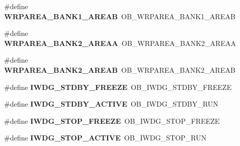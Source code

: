 \begin{DoxyCompactItemize}
\item 
\hypertarget{group___h_a_l___f_l_a_s_h___aliased___defines_ga073be154a6602831a813316fa4fb17ca}{\#define {\bfseries W\-R\-P\-A\-R\-E\-A\-\_\-\-B\-A\-N\-K1\-\_\-\-A\-R\-E\-A\-B}~O\-B\-\_\-\-W\-R\-P\-A\-R\-E\-A\-\_\-\-B\-A\-N\-K1\-\_\-\-A\-R\-E\-A\-B}\label{group___h_a_l___f_l_a_s_h___aliased___defines_ga073be154a6602831a813316fa4fb17ca}

\item 
\hypertarget{group___h_a_l___f_l_a_s_h___aliased___defines_ga385f3bbec731cc31de0a8f83943f678c}{\#define {\bfseries W\-R\-P\-A\-R\-E\-A\-\_\-\-B\-A\-N\-K2\-\_\-\-A\-R\-E\-A\-A}~O\-B\-\_\-\-W\-R\-P\-A\-R\-E\-A\-\_\-\-B\-A\-N\-K2\-\_\-\-A\-R\-E\-A\-A}\label{group___h_a_l___f_l_a_s_h___aliased___defines_ga385f3bbec731cc31de0a8f83943f678c}

\item 
\hypertarget{group___h_a_l___f_l_a_s_h___aliased___defines_gad9e82d85eb324cdc5d4c5071a5b41dc6}{\#define {\bfseries W\-R\-P\-A\-R\-E\-A\-\_\-\-B\-A\-N\-K2\-\_\-\-A\-R\-E\-A\-B}~O\-B\-\_\-\-W\-R\-P\-A\-R\-E\-A\-\_\-\-B\-A\-N\-K2\-\_\-\-A\-R\-E\-A\-B}\label{group___h_a_l___f_l_a_s_h___aliased___defines_gad9e82d85eb324cdc5d4c5071a5b41dc6}

\item 
\hypertarget{group___h_a_l___f_l_a_s_h___aliased___defines_ga29ecb28c7e5de9b73778a4de74cdba4e}{\#define {\bfseries I\-W\-D\-G\-\_\-\-S\-T\-D\-B\-Y\-\_\-\-F\-R\-E\-E\-Z\-E}~O\-B\-\_\-\-I\-W\-D\-G\-\_\-\-S\-T\-D\-B\-Y\-\_\-\-F\-R\-E\-E\-Z\-E}\label{group___h_a_l___f_l_a_s_h___aliased___defines_ga29ecb28c7e5de9b73778a4de74cdba4e}

\item 
\hypertarget{group___h_a_l___f_l_a_s_h___aliased___defines_ga24bb71bfed2d31ab1c89e2c14617a738}{\#define {\bfseries I\-W\-D\-G\-\_\-\-S\-T\-D\-B\-Y\-\_\-\-A\-C\-T\-I\-V\-E}~O\-B\-\_\-\-I\-W\-D\-G\-\_\-\-S\-T\-D\-B\-Y\-\_\-\-R\-U\-N}\label{group___h_a_l___f_l_a_s_h___aliased___defines_ga24bb71bfed2d31ab1c89e2c14617a738}

\item 
\hypertarget{group___h_a_l___f_l_a_s_h___aliased___defines_gafa9a4aaff8763eed2aaeae674dffd159}{\#define {\bfseries I\-W\-D\-G\-\_\-\-S\-T\-O\-P\-\_\-\-F\-R\-E\-E\-Z\-E}~O\-B\-\_\-\-I\-W\-D\-G\-\_\-\-S\-T\-O\-P\-\_\-\-F\-R\-E\-E\-Z\-E}\label{group___h_a_l___f_l_a_s_h___aliased___defines_gafa9a4aaff8763eed2aaeae674dffd159}

\item 
\hypertarget{group___h_a_l___f_l_a_s_h___aliased___defines_gab00290e46777b5c22558554403dee8c4}{\#define {\bfseries I\-W\-D\-G\-\_\-\-S\-T\-O\-P\-\_\-\-A\-C\-T\-I\-V\-E}~O\-B\-\_\-\-I\-W\-D\-G\-\_\-\-S\-T\-O\-P\-\_\-\-R\-U\-N}\label{group___h_a_l___f_l_a_s_h___aliased___defines_gab00290e46777b5c22558554403dee8c4}


\end{DoxyCompactItemize}
